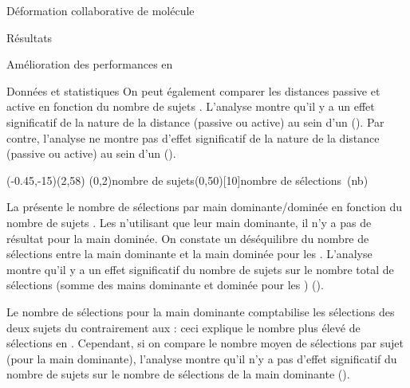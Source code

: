\documentclass[myfrancais,ngerman,english,frenchb]{mythesis}
\begin{document}
\begin{mychapter}{Déformation collaborative de molécule}
\begin{mysection}{Résultats}
\begin{mysubsection}{Amélioration des performances en }
\begin{mysubsubsection}{Données et statistiques}
					On peut également comparer les distances passive et active en fonction du nombre de sujets .
					L'analyse montre qu'il y a un effet significatif de la nature de la distance (passive ou active) au sein d'un  ().
					Par contre, l'analyse ne montre pas d'effet significatif de la nature de la distance (passive ou active) au sein d'un  ().

					\begin{myfigure}
						\begin{myps}(-0.45,-15)(2,58)
							\myaxes(0,2){nombre de sujets}(0,50)[10]{nombre de sélections~(nb)}
						\end{myps}
					\end{myfigure}

					La  présente le nombre de sélections par main dominante/dominée  en fonction du nombre de sujets .
					Les  n'utilisant que leur main dominante, il n'y a pas de résultat pour la main dominée.
					On constate un déséquilibre du nombre de sélections entre la main dominante et la main dominée pour les .
					L'analyse montre qu'il y a un effet significatif du nombre de sujets  sur le nombre total de sélections (somme des mains dominante et dominée pour les )  ().

					Le nombre de sélections pour la main dominante comptabilise les sélections des deux sujets du  contrairement aux  : ceci explique le nombre plus élevé de sélections en .
					Cependant, si on compare le nombre moyen de sélections par sujet (pour la main dominante), l'analyse montre qu'il n'y a pas d'effet significatif du nombre de sujets  sur le nombre de sélections de la main dominante  ().


\end{mysubsubsection}
\end{mysubsection}
\end{mysection}
\end{mychapter}
\end{document}
